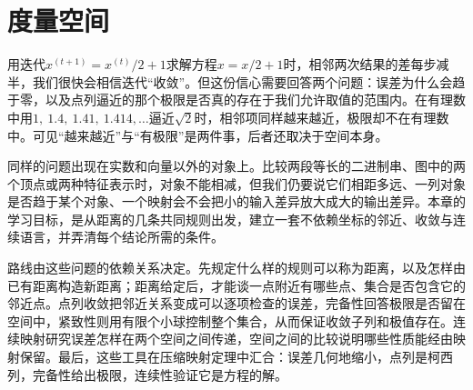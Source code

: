\chapter{度量空间}
\label{chap:metric-spaces}

用迭代$x^{(t+1)}=x^{(t)}/2+1$求解方程$x=x/2+1$时，相邻两次结果的差每步减半，我们很快会相信迭代“收敛”。但这份信心需要回答两个问题：误差为什么会趋于零，以及点列逼近的那个极限是否真的存在于我们允许取值的范围内。在有理数中用$1,\ 1.4,\ 1.41,\ 1.414,\dots$逼近$\sqrt2$时，相邻项同样越来越近，极限却不在有理数中。可见“越来越近”与“有极限”是两件事，后者还取决于空间本身。

同样的问题出现在实数和向量以外的对象上。比较两段等长的二进制串、图中的两个顶点或两种特征表示时，对象不能相减，但我们仍要说它们相距多远、一列对象是否趋于某个对象、一个映射会不会把小的输入差异放大成大的输出差异。本章的学习目标，是从距离的几条共同规则出发，建立一套不依赖坐标的邻近、收敛与连续语言，并弄清每个结论所需的条件。

路线由这些问题的依赖关系决定。先规定什么样的规则可以称为距离，以及怎样由已有距离构造新距离；距离给定后，才能谈一点附近有哪些点、集合是否包含它的邻近点。点列收敛把邻近关系变成可以逐项检查的误差，完备性回答极限是否留在空间中，紧致性则用有限个小球控制整个集合，从而保证收敛子列和极值存在。连续映射研究误差怎样在两个空间之间传递，空间之间的比较说明哪些性质能经由映射保留。最后，这些工具在压缩映射定理中汇合：误差几何地缩小，点列是柯西列，完备性给出极限，连续性验证它是方程的解。









